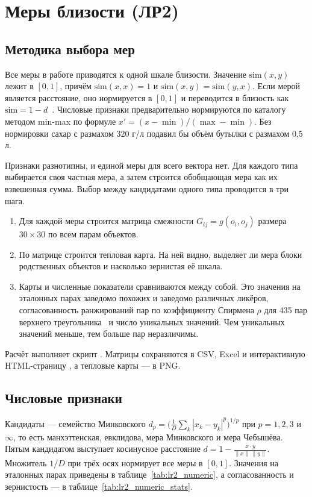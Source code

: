 \chapter{Меры близости (ЛР2)}

\section{Методика выбора мер}
\label{sec:lr2_method}

Все меры в работе приводятся к одной шкале близости. Значение $\mathrm{sim}(x,y)$ лежит в $[0,1]$, причём $\mathrm{sim}(x,x)=1$ и $\mathrm{sim}(x,y)=\mathrm{sim}(y,x)$. Если мерой является расстояние, оно нормируется в $[0,1]$ и переводится в близость как $\mathrm{sim} = 1 - d$~\cite{bolshakova2011}. Числовые признаки предварительно нормируются по каталогу методом min-max по формуле $x' = (x - \min)/(\max - \min)$. Без нормировки сахар с размахом 320 г/л подавил бы объём бутылки с размахом 0,5 л.

Признаки разнотипны, и единой меры для всего вектора нет. Для каждого типа выбирается своя частная мера, а затем строится обобщающая мера как их взвешенная сумма. Выбор между кандидатами одного типа проводится в три шага.
\begin{enumerate}[leftmargin=1.6\parindent]
	\item Для каждой меры строится матрица смежности $G_{ij} = g(o_i, o_j)$ размера $30\times30$ по всем парам объектов.
	\item По матрице строится тепловая карта. На ней видно, выделяет ли мера блоки родственных объектов и насколько зернистая её шкала.
	\item Карты и численные показатели сравниваются между собой. Это значения на эталонных парах заведомо похожих и заведомо различных ликёров, согласованность ранжирований пар по коэффициенту Спирмена $\rho$ для 435 пар верхнего треугольника~\cite{spearman1904} и число уникальных значений. Чем уникальных значений меньше, тем больше пар неразличимы.
\end{enumerate}

Расчёт выполняет скрипт . Матрицы сохраняются в CSV, Excel и интерактивную HTML-страницу , а тепловые карты --- в PNG.

\section{Числовые признаки}

Кандидаты --- семейство Минковского $d_p = \bigl(\tfrac{1}{D}\sum_{k}|x_k-y_k|^p\bigr)^{1/p}$ при $p = 1, 2, 3$ и $\infty$, то есть манхэттенская, евклидова, мера Минковского и мера Чебышёва. Пятым кандидатом выступает косинусное расстояние $d = 1 - \frac{x\cdot y}{\|x\|\,\|y\|}$. Множитель $1/D$ при трёх осях нормирует все меры в $[0,1]$. Значения на эталонных парах приведены в таблице~\ref{tab:lr2_numeric}, а согласованность и зернистость --- в таблице~\ref{tab:lr2_numeric_stats}.

